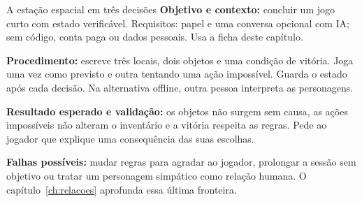 \begin{promptlabbox}{A estação espacial em três decisões}
\textbf{Objetivo e contexto:} concluir um jogo curto com estado verificável. Requisitos: papel e uma conversa opcional com IA; sem código, conta paga ou dados pessoais. Usa a ficha deste capítulo.

\textbf{Procedimento:} escreve três locais, dois objetos e uma condição de vitória. Joga uma vez como previsto e outra tentando uma ação impossível. Guarda o estado após cada decisão. Na alternativa offline, outra pessoa interpreta as personagens.

\textbf{Resultado esperado e validação:} os objetos não surgem sem causa, as ações impossíveis não alteram o inventário e a vitória respeita as regras. Pede ao jogador que explique uma consequência das suas escolhas.

\textbf{Falhas possíveis:} mudar regras para agradar ao jogador, prolongar a sessão sem objetivo ou tratar um personagem simpático como relação humana. O capítulo~\ref{ch:relacoes} aprofunda essa última fronteira.
\end{promptlabbox}
